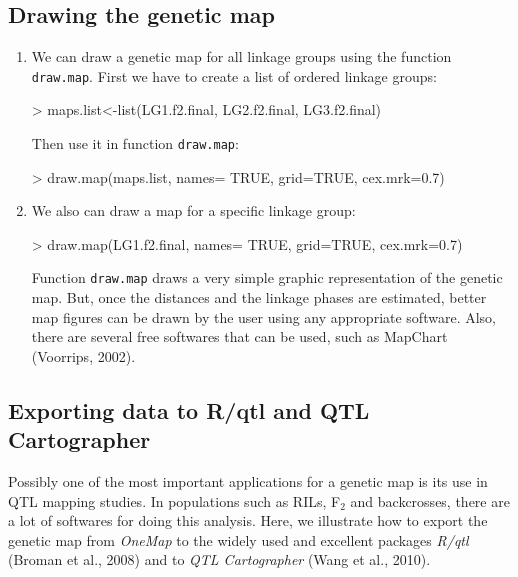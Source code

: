 \documentclass[letterpaper,12pt,oneside]{article}
\begin{document}
\subsection{Drawing the genetic map}
\begin{enumerate}

\item We can draw a genetic map for all linkage groups using the function {\tt draw.map}. First we have to create a list of ordered linkage groups:
  
\begin{Schunk}
\begin{Sinput}
> maps.list<-list(LG1.f2.final, LG2.f2.final, LG3.f2.final)
\end{Sinput}
\end{Schunk}

Then use it in function {\tt draw.map}:

\begin{Schunk}
\begin{Sinput}
> draw.map(maps.list, names= TRUE, grid=TRUE, cex.mrk=0.7)
\end{Sinput}
\end{Schunk}

\item We also can draw a map for a specific linkage group:

\begin{Schunk}
\begin{Sinput}
> draw.map(LG1.f2.final, names= TRUE, grid=TRUE, cex.mrk=0.7)
\end{Sinput}
\end{Schunk}

Function {\tt draw.map} draws a very simple graphic representation of the genetic map. But, once the distances and the linkage phases are estimated, better map figures can be drawn by the user using any appropriate software. Also, there are several free softwares that can be used, such as MapChart (Voorrips, 2002).

\end{enumerate}

\subsection{Exporting data to R/qtl and QTL Cartographer}

  
Possibly one of the most important applications for a genetic map is its use in QTL mapping studies. In populations such as RILs, F$_2$ and backcrosses, there are a lot of softwares for doing this analysis. Here, we illustrate how to export the genetic map from {\sl OneMap} to the widely used and excellent packages {\sl R/qtl} (Broman et al., 2008) and to {\sl QTL Cartographer} (Wang et al., 2010). 
\end{document}
